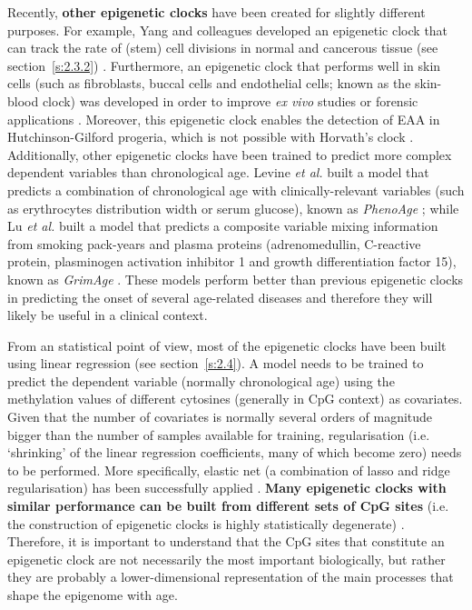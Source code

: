 Recently, \textbf{other epigenetic clocks} have been created for slightly different purposes. For example, Yang and colleagues developed an epigenetic clock that can track the rate of (stem) cell divisions in normal and cancerous tissue (see section~\ref{s:2.3.2}) \citep{Yang2016}. Furthermore, an epigenetic clock that performs well in skin cells (such as fibroblasts, buccal cells and endothelial cells; known as the skin-blood clock) was developed in order to improve \textit{ex vivo} studies or forensic applications \citep{Horvath2018a}. Moreover, this epigenetic clock enables the detection of \acrshort{EAA} in Hutchinson-Gilford progeria, which is not possible with Horvath's clock \citep{Horvath2018a}. Additionally, other epigenetic clocks have been trained to predict more complex dependent variables than chronological age. Levine \textit{et al.} built a model that predicts a combination of chronological age with clinically-relevant variables (such as erythrocytes distribution width or serum glucose), known as \textit{PhenoAge} \citep{Levine2018}; while Lu \textit{et al.} built a model that predicts a composite variable mixing information from smoking pack-years and plasma proteins (adrenomedullin, C-reactive protein, plasminogen activation inhibitor 1 and growth differentiation factor 15), known as \textit{GrimAge} \citep{Lu2019}. These models perform better than previous epigenetic clocks in predicting the onset of several age-related diseases and therefore they will likely be useful in a clinical context.    

\bigskip

From an statistical point of view, most of the epigenetic clocks have been built using linear regression (see section~\ref{s:2.4}). A model needs to be trained to predict the dependent variable (normally chronological age) using the methylation values of different cytosines (generally in CpG context) as covariates. Given that the number of covariates is normally several orders of magnitude bigger than the number of samples available for training, regularisation (i.e. `shrinking' of the linear regression coefficients, many of which become zero) needs to be performed. More specifically, elastic net (a combination of lasso and ridge regularisation) has been successfully applied \citep{Friedman2010}. \textbf{Many epigenetic clocks with similar performance can be built from different sets of CpG sites} (i.e. the construction of epigenetic clocks is highly statistically degenerate) \citep{Thompson2018}. Therefore, it is important to understand that the CpG sites that constitute an epigenetic clock are not necessarily the most important biologically, but rather they are probably a lower-dimensional representation of the main processes that shape the epigenome with age.


